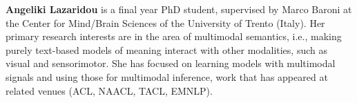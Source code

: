   {\bfseries Angeliki Lazaridou} is a final year PhD student, supervised by Marco Baroni at the Center for Mind/Brain Sciences of the University of Trento (Italy). Her primary research interests are in the area of multimodal semantics, i.e., making purely text-based models of meaning interact with other modalities, such as visual and sensorimotor. She has focused on learning models with multimodal signals and using those for multimodal inference, work that has appeared at related venues (ACL, NAACL, TACL, EMNLP).

